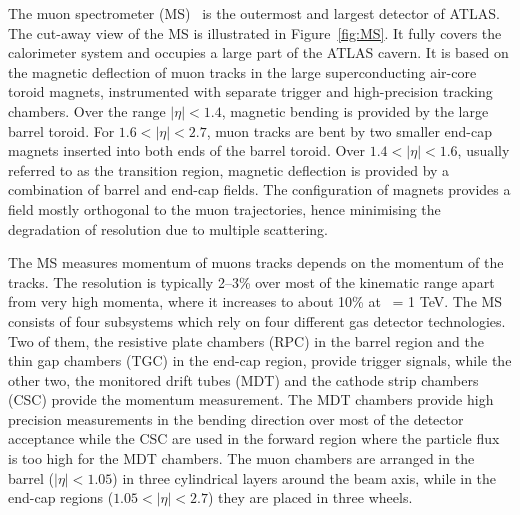 	
	The muon spectrometer (MS)~\cite{ATLAS-TDR-11} is the 
	outermost and largest detector of ATLAS. 
	The cut-away view of the MS is illustrated in Figure~\ref{fig:MS}.
	It fully covers the	calorimeter system and occupies a large part of the ATLAS cavern. 
	It is based on the magnetic deflection of muon tracks in the 
	large superconducting air-core toroid magnets, instrumented with
	separate trigger and high-precision tracking chambers. 
	Over the range $|\eta|< 1.4$, magnetic bending is provided by the large 
	barrel toroid. For $1.6 < |\eta|< 2.7$, muon tracks are bent by two smaller
	end-cap magnets inserted into both ends of the barrel toroid. 
	Over $1.4 < |\eta|< 1.6$, usually referred to as the transition region, 
	magnetic deflection is provided by a combination of barrel and end-cap
	fields. The configuration of magnets provides a field mostly orthogonal 
	to the muon trajectories, hence minimising the degradation of 
	resolution due to multiple scattering. 


	The MS measures momentum of muons tracks depends on the momentum 
	of the tracks. 
	The resolution is typically 2–3\% over most of the kinematic range
	apart from very high momenta, where it increases to about 10\% at \pt\ = 1 TeV.  
	The MS consists of four subsystems which rely on four different gas detector
	technologies. Two of them, the resistive plate chambers (RPC) in the barrel region 
	and the thin gap chambers (TGC) in the end-cap region, provide trigger signals, 
	while the other two, the monitored drift tubes (MDT) and the cathode strip 
	chambers (CSC) provide the momentum measurement. The MDT chambers provide high 
	precision measurements in the bending direction over most of the detector
	acceptance while the CSC are used in the forward region where the particle flux 
	is too high for the MDT	chambers. The muon chambers are arranged in the barrel 
	($|\eta| < 1.05$) in three cylindrical layers around the beam axis, 
	while in the end-cap regions ($1.05 < |\eta| < 2.7$) they are placed in three wheels.


